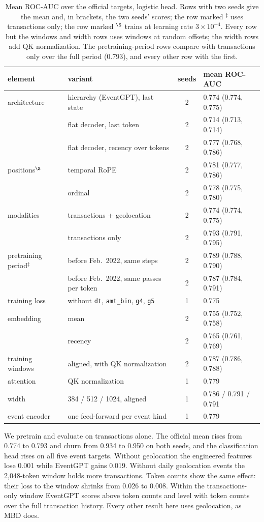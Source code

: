 \documentclass[12pt]{article}
\newcommand{\tok}[1]{\texttt{#1}}
\begin{document}
\begin{table}[htbp]
\centering
\caption{Mean ROC-AUC over the official targets, logistic head. Rows with two seeds give the mean and, in brackets, the two seeds' scores; the row marked $^\ddagger$ uses transactions only; the row marked $^\S$ trains at learning rate $3\times10^{-4}$. Every row but the windows and width rows uses windows at random offsets; the width rows add QK normalization. The pretraining-period rows compare with transactions only over the full period (0.793), and every other row with the first.}
\label{tab:ablations}
\footnotesize
\begin{tabular}{llcl}
\toprule
element & variant & seeds & mean ROC-AUC \\
\midrule
architecture & hierarchy (EventGPT), last state & 2 & 0.774 (0.774, 0.775) \\
 & flat decoder, last token & 2 & 0.714 (0.713, 0.714) \\
 & flat decoder, recency over tokens & 2 & 0.777 (0.768, 0.786) \\
positions$^\S$ & temporal RoPE & 2 & 0.781 (0.777, 0.786) \\
 & ordinal & 2 & 0.778 (0.775, 0.780) \\
modalities & transactions + geolocation & 2 & 0.774 (0.774, 0.775) \\
 & transactions only & 2 & 0.793 (0.791, 0.795) \\
pretraining period$^\ddagger$ & before Feb.~2022, same steps & 2 & 0.789 (0.788, 0.790) \\
 & before Feb.~2022, same passes per token & 2 & 0.787 (0.784, 0.791) \\
training loss & without \tok{dt}, \tok{amt\_bin}, \tok{g4}, \tok{g5} & 1 & 0.775 \\
embedding & mean & 2 & 0.755 (0.752, 0.758) \\
 & recency & 2 & 0.765 (0.761, 0.769) \\
training windows & aligned, with QK normalization & 2 & 0.787 (0.786, 0.788) \\
attention & QK normalization & 1 & 0.779 \\
width & 384 / 512 / 1024, aligned & 1 & 0.786 / 0.791 / 0.791 \\
event encoder & one feed-forward per event kind & 1 & 0.779 \\
\bottomrule
\end{tabular}
\end{table}

We pretrain and evaluate on transactions alone. The official mean rises from 0.774 to 0.793 and churn from 0.934 to 0.950 on both seeds, and the classification head rises on all five event targets. Without geolocation the engineered features lose 0.001 while EventGPT gains 0.019. Without daily geolocation events the 2,048-token window holds more transactions. Token counts show the same effect: their loss to the window shrinks from 0.026 to 0.008. Within the transactions-only window EventGPT scores above token counts and level with token counts over the full transaction history. Every other result here uses geolocation, as MBD does.
\end{document}
